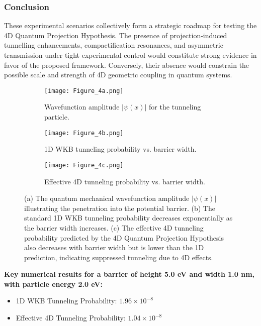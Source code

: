 \documentclass[12pt]{article}
\begin{document}
\subsubsection*{Conclusion}

These experimental scenarios collectively form a strategic roadmap for testing the 4D Quantum Projection Hypothesis. The presence of projection-induced tunnelling enhancements, compactification resonances, and asymmetric transmission under tight experimental control would constitute strong evidence in favor of the proposed framework. Conversely, their absence would constrain the possible scale and strength of 4D geometric coupling in quantum systems.

\begin{figure}[htbp]
    \centering
    \begin{subfigure}[b]{0.7\textwidth}
        \centering
        \texttt{[image: Figure\_4a.png]}
        \caption{Wavefunction amplitude $|\psi(x)|$ for the tunneling particle.}
        \label{fig:4a}
    \end{subfigure}
    \hfill
    \begin{subfigure}[b]{0.7\textwidth}
        \centering
        \texttt{[image: Figure\_4b.png]}
        \caption{1D WKB tunneling probability vs. barrier width.}
        \label{fig:4b}
    \end{subfigure}
    \hfill
    \begin{subfigure}[b]{0.7\textwidth}
        \centering
        \texttt{[image: Figure\_4c.png]}
        \caption{Effective 4D tunneling probability vs. barrier width.}
        \label{fig:4c}
    \end{subfigure}
    \caption{
    (a) The quantum mechanical wavefunction amplitude $|\psi(x)|$ illustrating the penetration into the potential barrier. 
    (b) The standard 1D WKB tunneling probability decreases exponentially as the barrier width increases.
    (c) The effective 4D tunneling probability predicted by the 4D Quantum Projection Hypothesis also decreases with barrier width but is lower than the 1D prediction, indicating suppressed tunneling due to 4D effects.
    }
    \label{fig:fig4}
\end{figure}

\vspace{0.5cm}

\noindent \textbf{Key numerical results for a barrier of height 5.0 eV and width 1.0 nm, with particle energy 2.0 eV:}
\begin{itemize}
    \item 1D WKB Tunneling Probability: $1.96 \times 10^{-8}$
    \item Effective 4D Tunneling Probability: $1.04 \times 10^{-8}$
\end{itemize}
\end{document}
